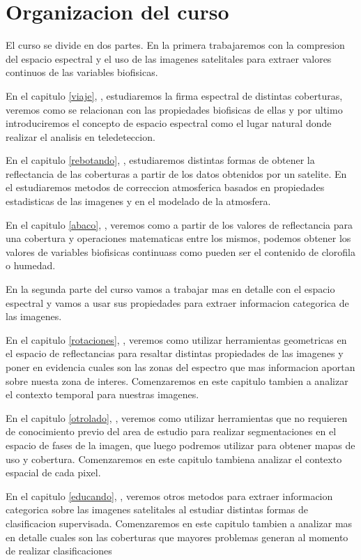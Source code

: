 \documentclass[a4paper]{book}
\begin{document}
\section{Organizacion del curso}

El curso se divide en dos partes. En la primera trabajaremos con la compresion
del espacio espectral y el uso de las imagenes satelitales para extraer valores
continuos de las variables biofisicas.

En el capitulo \ref{viaje}, , estudiaremos la firma espectral de
distintas coberturas, veremos como se relacionan con las propiedades biofisicas
de ellas y por ultimo introduciremos el concepto de espacio espectral como el
lugar natural donde realizar el analisis en teledeteccion.

En el capitulo \ref{rebotando}, , estudiaremos distintas
formas de obtener la reflectancia de las coberturas a partir de los datos obtenidos
por un satelite. En el estudiaremos metodos de correccion atmosferica basados
en propiedades estadisticas de las imagenes y en el modelado de la atmosfera.

En el capitulo \ref{abaco}, , veremos como a partir de los valores
de reflectancia para una cobertura y operaciones matematicas entre los mismos,
podemos obtener los valores de variables biofisicas continuass como pueden ser
el contenido de clorofila o humedad.

En la segunda parte del curso vamos a trabajar mas en detalle con el espacio
espectral y vamos a usar sus propiedades para extraer informacion categorica de
las imagenes.

En el capitulo \ref{rotaciones}, , veremos como utilizar
herramientas geometricas en el espacio de reflectancias para resaltar distintas
propiedades de las imagenes y poner en evidencia cuales son las zonas del espectro
que mas informacion aportan sobre nuesta zona de interes. Comenzaremos en este
capitulo tambien a analizar el contexto temporal para nuestras imagenes.

En el capitulo \ref{otrolado}, , veremos como utilizar herramientas
que no requieren de conocimiento previo del area de estudio para realizar segmentaciones
en el espacio de fases de la imagen, que luego podremos utilizar para obtener mapas
de uso y cobertura. Comenzaremos en este capitulo tambiena analizar el contexto
espacial de cada pixel.

En el capitulo \ref{educando}, , veremos otros metodos para extraer
informacion categorica sobre las imagenes satelitales al estudiar distintas
formas de clasificacion supervisada. Comenzaremos en este capitulo tambien a
analizar mas en detalle cuales son las coberturas que mayores problemas generan al
momento de realizar clasificaciones
\end{document}
